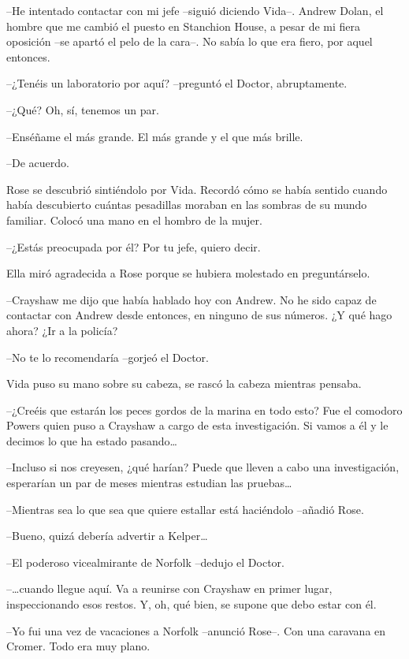 {--He intentado contactar con mi jefe --siguió diciendo Vida--. Andrew
 Dolan, el hombre que me cambió el puesto en Stanchion House, a pesar de
 mi fiera oposición --se apartó el pelo de la cara--. No sabía lo que era
fiero, por aquel entonces.}

{--¿Tenéis un laboratorio por aquí? --preguntó el Doctor, abruptamente.}

{--¿Qué? Oh, sí, tenemos un par.}

{--Enséñame el más grande. El más grande y el que más brille.}

{--De acuerdo.}

{Rose se descubrió sintiéndolo por Vida. Recordó cómo se había sentido
 cuando había descubierto cuántas pesadillas moraban en las sombras de su
mundo familiar. Colocó una mano en el hombro de la mujer.}

{--¿Estás preocupada por él? Por tu jefe, quiero decir.}

{Ella miró agradecida a Rose porque se hubiera molestado en
preguntárselo.}

{--Crayshaw me dijo que había hablado hoy con Andrew. No he sido capaz
 de contactar con Andrew desde entonces, en ninguno de sus números. ¿Y
qué hago ahora? ¿Ir a la policía?}

{--No te lo recomendaría --gorjeó el Doctor.}

{Vida puso su mano sobre su cabeza, se rascó la cabeza mientras
pensaba.}

{--¿Creéis que estarán los peces gordos de la marina en todo esto? Fue
 el comodoro Powers quien puso a Crayshaw a cargo de esta investigación.
 Si vamos a él y le decimos lo que ha estado pasando\ldots{}}

{--Incluso si nos creyesen, ¿qué harían? Puede que lleven a cabo una
 investigación, esperarían un par de meses mientras estudian las
 pruebas\ldots{}}

{--Mientras sea lo que sea que quiere estallar está haciéndolo --añadió
Rose.}

{--Bueno, quizá debería advertir a Kelper\ldots{}}

{--El poderoso vicealmirante de Norfolk --dedujo el Doctor.}

{--\ldots{}cuando llegue aquí. Va a reunirse con Crayshaw en primer
 lugar, inspeccionando esos restos. Y, oh, qué bien, se supone que debo
estar con él.}

{--Yo fui una vez de vacaciones a Norfolk --anunció Rose--. Con una
caravana en Cromer. Todo era muy plano.}

